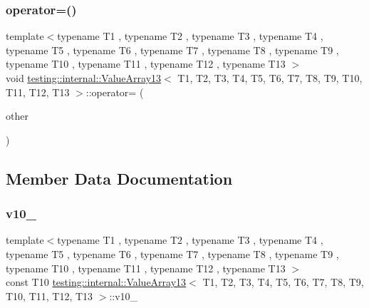 \mbox{\label{classtesting_1_1internal_1_1_value_array13_a27f6f2eef1fbeeeb65a23015e3c41044}} 
\subsubsection{\texorpdfstring{operator=()}{operator=()}}
{\footnotesize\ttfamily template$<$typename T1 , typename T2 , typename T3 , typename T4 , typename T5 , typename T6 , typename T7 , typename T8 , typename T9 , typename T10 , typename T11 , typename T12 , typename T13 $>$ \\
void \mbox{\hyperlink{classtesting_1_1internal_1_1_value_array13}{testing\+::internal\+::\+Value\+Array13}}$<$ T1, T2, T3, T4, T5, T6, T7, T8, T9, T10, T11, T12, T13 $>$\+::operator= (\begin{DoxyParamCaption}\item[{const \mbox{\hyperlink{classtesting_1_1internal_1_1_value_array13}{Value\+Array13}}$<$ T1, T2, T3, T4, T5, T6, T7, T8, T9, T10, T11, T12, T13 $>$ \&}]{other }\end{DoxyParamCaption})\hspace{0.3cm}{\ttfamily [private]}}



\subsection{Member Data Documentation}
\mbox{\label{classtesting_1_1internal_1_1_value_array13_a334b48add5a85775b58e9d4cb02ff649}} 
\subsubsection{\texorpdfstring{v10\_}{v10\_}}
{\footnotesize\ttfamily template$<$typename T1 , typename T2 , typename T3 , typename T4 , typename T5 , typename T6 , typename T7 , typename T8 , typename T9 , typename T10 , typename T11 , typename T12 , typename T13 $>$ \\
const T10 \mbox{\hyperlink{classtesting_1_1internal_1_1_value_array13}{testing\+::internal\+::\+Value\+Array13}}$<$ T1, T2, T3, T4, T5, T6, T7, T8, T9, T10, T11, T12, T13 $>$\+::v10\+\_\+\hspace{0.3cm}{\ttfamily [private]}}

